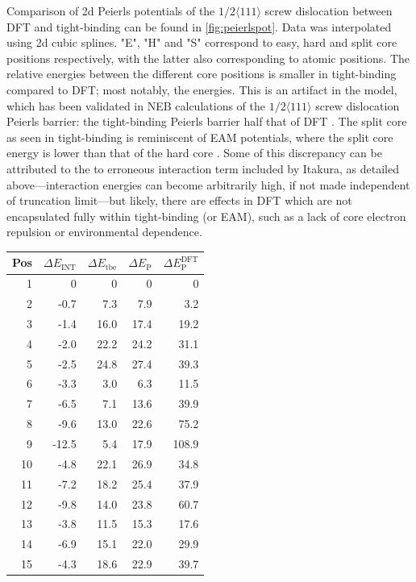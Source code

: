 \documentclass[a4paper,11pt]{article}
\begin{document}
Comparison of 2d Peierls potentials of the \(1/2\langle 111 \rangle\) screw dislocation between DFT and
tight-binding can be found in \ref{fig:peierlspot}. Data was interpolated using 2d cubic splines. "E", "H" and "S"
correspond to easy, hard and split core positions respectively, with the latter also
corresponding to atomic positions. 
The relative energies between the different core
positions is smaller in tight-binding compared to DFT; most notably, the energies. This is
an artifact in the model, which has been validated in NEB calculations of the \(1/2\langle 111\rangle\)
screw dislocation Peierls barrier: the tight-binding Peierls barrier half that of DFT
\cite{Simpson2019}. The split core as seen in tight-binding is reminiscent of EAM potentials,
where the split core energy is lower than that of the hard core \cite{Itakura2012}. Some of
this discrepancy can be attributed to the to erroneous interaction term included by Itakura,
as detailed above---interaction energies can become arbitrarily high, if not made independent of
truncation limit---but likely, there are effects in DFT which are not encapsulated fully
within tight-binding (or EAM), such as a lack of core electron repulsion or environmental
dependence. 

\begin{center}
\begin{tabular}{rrrrr}
Pos & \(\Delta E_{\text{INT}}\) & \(\Delta E_{\text{tbe}}\) & \(\Delta E_{\text{P}}\) & \(\Delta E_{\text{P}}^{\text{DFT}}\)\\
\hline
1 & 0 & 0 & 0 & 0\\
2 & -0.7 & 7.3 & 7.9 & 3.2\\
3 & -1.4 & 16.0 & 17.4 & 19.2\\
4 & -2.0 & 22.2 & 24.2 & 31.1\\
5 & -2.5 & 24.8 & 27.4 & 39.3\\
6 & -3.3 & 3.0 & 6.3 & 11.5\\
7 & -6.5 & 7.1 & 13.6 & 39.9\\
8 & -9.6 & 13.0 & 22.6 & 75.2\\
9 & -12.5 & 5.4 & 17.9 & 108.9\\
10 & -4.8 & 22.1 & 26.9 & 34.8\\
11 & -7.2 & 18.2 & 25.4 & 37.9\\
12 & -9.8 & 14.0 & 23.8 & 60.7\\
13 & -3.8 & 11.5 & 15.3 & 17.6\\
14 & -6.9 & 15.1 & 22.0 & 29.9\\
15 & -4.3 & 18.6 & 22.9 & 39.7\\
\end{tabular}
\end{center}
\end{document}
